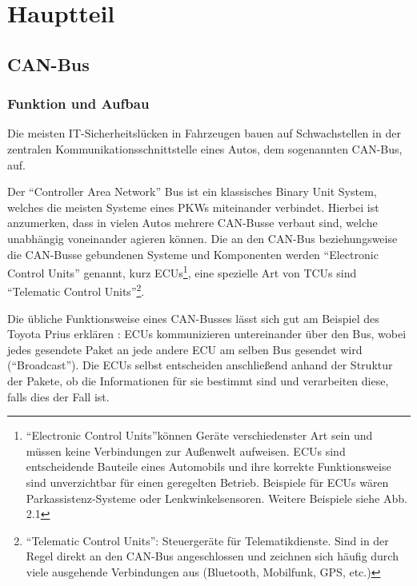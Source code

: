 \documentclass[
    fontsize=12pt,
    headings=small,
    parskip=half,           %
    bibliography=totoc,
    numbers=noenddot,       %
    open=any,               %
    ]{scrreprt}
\begin{document}


\chapter{Hauptteil}
\section{CAN-Bus}
\subsection{Funktion und Aufbau}
Die meisten IT-Sicherheitslücken in Fahrzeugen bauen auf Schwachstellen in der zentralen Kommunikationsschnittstelle eines Autos, dem sogenannten CAN-Bus, auf.\par
Der "`Controller Area Network"' Bus ist ein klassisches Binary Unit System, welches die meisten Systeme eines PKWs miteinander verbindet. Hierbei ist anzumerken, dass in vielen Autos mehrere CAN-Busse verbaut sind, welche unabhängig voneinander agieren können. Die an den CAN-Bus beziehungsweise die CAN-Busse gebundenen Systeme und Komponenten werden "`Electronic Control Units"' genannt, kurz ECUs\footnote{"`Electronic Control Units"'können Geräte verschiedenster Art sein und müssen keine Verbindungen zur Außenwelt aufweisen. ECUs sind entscheidende Bauteile eines Automobils und ihre korrekte Funktionsweise sind unverzichtbar für einen geregelten Betrieb. Beispiele für ECUs wären Parkassistenz-Systeme oder Lenkwinkelsensoren. Weitere Beispiele siehe Abb. 2.1}, eine spezielle Art von TCUs sind "`Telematic Control Units"'\footnote{"`Telematic Control Units"': Steuergeräte für Telematikdienste. Sind in der Regel direkt an den CAN-Bus angeschlossen und zeichnen sich häufig durch viele ausgehende Verbindungen aus (Bluetooth, Mobilfunk, GPS, etc.)}.\par
Die übliche Funktionsweise eines CAN-Busses lässt sich gut am Beispiel des Toyota Prius erklären \cite{MiV13}: ECUs kommunizieren untereinander über den Bus, wobei jedes gesendete Paket an jede andere ECU am selben Bus gesendet wird ("`Broadcast"'). Die ECUs selbst entscheiden anschließend anhand der Struktur der Pakete, ob die Informationen für sie bestimmt sind und verarbeiten diese, falls dies der Fall ist.\par
\end{document}
